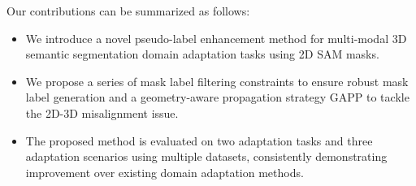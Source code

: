 

Our contributions can be summarized as follows:
\begin{itemize}
   \item We introduce a novel pseudo-label enhancement method for multi-modal 3D semantic segmentation domain adaptation tasks using 2D SAM masks. 
   \item We propose a series of mask label filtering constraints to ensure robust mask label generation and a geometry-aware propagation strategy GAPP to tackle the 2D-3D misalignment issue. 
   \item The proposed method is evaluated on two adaptation tasks and three adaptation scenarios using multiple datasets, consistently demonstrating improvement over existing domain adaptation methods.
\end{itemize}